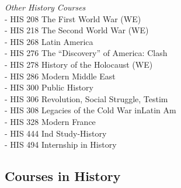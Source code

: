 \documentclass[
  letterpaper,
]{scrbook}
\begin{document}
\emph{Other History Courses}\\
- HIS 208 The First World War (WE)\\
- HIS 218 The Second World War (WE)\\
- HIS 268 Latin America\\
- HIS 276 The ``Discovery'' of America: Clash\\
- HIS 278 History of the Holocaust (WE)\\
- HIS 286 Modern Middle East\\
- HIS 300 Public History\\
- HIS 306 Revolution, Social Struggle, Testim\\
- HIS 308 Legacies of the Cold War inLatin Am\\
- HIS 328 Modern France\\
- HIS 444 Ind Study-History\\
- HIS 494 Internship in History

\subsection{Courses in History}\label{courses-in-history}
\end{document}
